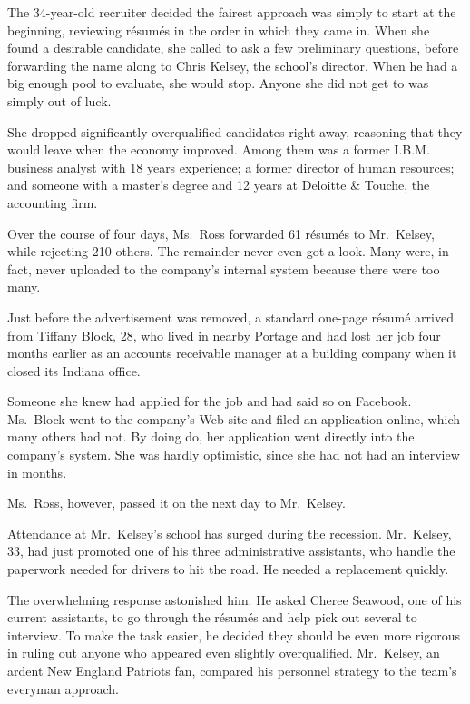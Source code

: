 ﻿\documentclass[12pt]{article}
\begin{document}
The 34-year-old recruiter decided the fairest approach was simply to start at the beginning,
reviewing r\'esum\'es in the order in which they came in. When she found a desirable candidate, she
called to ask a few preliminary questions, before forwarding the name along to Chris Kelsey, the
school's director. When he had a big enough pool to evaluate, she would stop. Anyone she did not get
to was simply out of luck.

She dropped significantly overqualified candidates right away, reasoning that they would leave when
the economy improved. Among them was a former I.B.M. business analyst with 18 years experience; a
former director of human resources; and someone with a master's degree and 12 years at Deloitte \&
Touche, the accounting firm.

Over the course of four days, Ms.~Ross forwarded 61 r\'esum\'es to Mr.~Kelsey, while rejecting 210
others. The remainder never even got a look. Many were, in fact, never uploaded to the company's
internal system because there were too many.

Just before the advertisement was removed, a standard one-page r\'esum\'e arrived from Tiffany
Block, 28, who lived in nearby Portage and had lost her job four months earlier as an accounts
receivable manager at a building company when it closed its Indiana office.

Someone she knew had applied for the job and had said so on Facebook. Ms.~Block went to the
company's Web site and filed an application online, which many others had not. By doing do, her
application went directly into the company's system. She was hardly optimistic, since she had not
had an interview in months.

Ms.~Ross, however, passed it on the next day to Mr.~Kelsey.

Attendance at Mr.~Kelsey's school has surged during the recession. Mr.~Kelsey, 33, had just promoted
one of his three administrative assistants, who handle the paperwork needed for drivers to hit the
road. He needed a replacement quickly.

The overwhelming response astonished him. He asked Cheree Seawood, one of his current assistants, to
go through the r\'esum\'es and help pick out several to interview. To make the task easier, he
decided they should be even more rigorous in ruling out anyone who appeared even slightly
overqualified. Mr.~Kelsey, an ardent New England Patriots fan, compared his personnel strategy to
the team's everyman approach.
\end{document}

